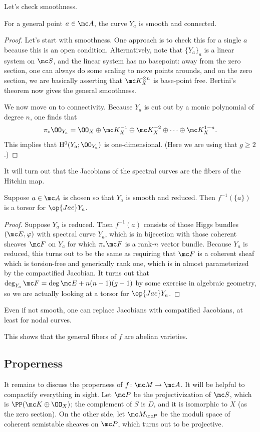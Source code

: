 \documentclass{article}
\begin{document}
Let's check smoothness.
\begin{proposition}
	For a general point $a\in\mc A$, the curve $Y_a$ is smooth and connected.
\end{proposition}
\begin{proof}
	Let's start with smoothness. One approach is to check this for a single $a$ because this is an open condition. Alternatively, note that $\{Y_a\}_a$ is a linear system on $\mc S$, and the linear system has no basepoint: away from the zero section, one can always do some scaling to move points arounds, and on the zero section, we are basically asserting that $\mc K_X^{\otimes n}$ is base-point free. Bertini's theorem now gives the general smoothness.

	We now move on to connectivity. Because $Y_a$ is cut out by a monic polynomial of degree $n$, one finds that
	\[\pi_*\OO_{Y_a}=\OO_X\oplus\mc K_X^{-1}\oplus\mc K_X^{-2}\oplus\cdots\oplus\mc K_X^{1-n}.\]
	This implies that $\mathrm H^0(Y_a;\OO_{Y_a})$ is one-dimensional. (Here we are using that $g\ge2$.)
\end{proof}
It will turn out that the Jacobians of the spectral curves are the fibers of the Hitchin map.
\begin{proposition}
	Suppose $a\in\mc A$ is chosen so that $Y_a$ is smooth and reduced. Then $f^{-1}(\{a\})$ is a torsor for $\op{Jac}Y_a$.
\end{proposition}
\begin{proof}
	Suppose $Y_a$ is reduced. Then $f^{-1}(a)$ consists of those Higgs bundles $(\mc E,\varphi)$ with spectral curve $Y_a$, which is in bijecetion with those coherent sheaves $\mc F$ on $Y_a$ for which $\pi_*\mc F$ is a rank-$n$ vector bundle. Because $Y_a$ is reduced, this turns out to be the same as requiring that $\mc F$ is a coherent sheaf which is torsion-free and generically rank one, which is in almost parameterized by the compactified Jacobian. It turns out that $\deg_{Y_a}\mc F=\deg\mc E+n(n-1)(g-1)$ by some exercise in algebraic geometry, so we are actually looking at a torsor for $\op{Jac}Y_a$.
\end{proof}
\begin{remark}
	Even if not smooth, one can replace Jacobians with compatified Jacobians, at least for nodal curves.
\end{remark}
This shows that the general fibers of $f$ are abelian varieties.

\subsection{Properness}
It remains to discuss the properness of $f\colon\mc M\to\mc A$. It will be helpful to compactify everything in sight. Let $\mc P$ be the projectivization of $\mc S$, which is $\PP(\mc K\oplus\OO_X)$; the complement of $S$ is $D$, and it is isomorphic to $X$ (as the zero section). On the other side, let $\mc M_{\mc P}$ be the moduli space of coherent semistable sheaves on $\mc P$, which turns out to be projective.
\end{document}
